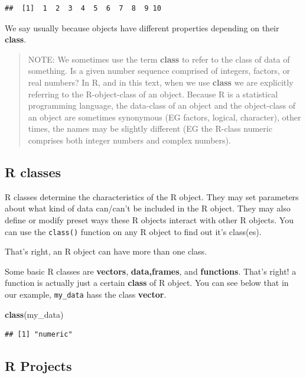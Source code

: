 \documentclass[
]{book}
\newenvironment{Shaded}{\begin{snugshade}}{\end{snugshade}}
\newcommand{\FunctionTok}[1]{\textcolor[rgb]{0.13,0.29,0.53}{\textbf{#1}}}
\newcommand{\NormalTok}[1]{#1}
\begin{document}
\begin{verbatim}
##  [1]  1  2  3  4  5  6  7  8  9 10
\end{verbatim}

We say usually because objects have different properties depending on their \textbf{class}.

\begin{quote}
NOTE: We sometimes use the term \textbf{class} to refer to the class of data of something. Is a given number sequence comprised of integers, factors, or real numbers? In R, and in this text, when we use \textbf{class} we are explicitly referring to the R-object-class of an object. Because R is a statistical programming language, the data-class of an object and the object-class of an object are sometimes synonymous (EG factors, logical, character), other times, the names may be slightly different (EG the R-class numeric comprises both integer numbers and complex numbers).
\end{quote}

\hypertarget{r-classes}{%
\subsection{R classes}\label{r-classes}}

R classes determine the characteristics of the R object. They may set parameters about what kind of data can/can't be included in the R object. They may also define or modify preset ways these R objects interact with other R objects. You can use the \texttt{class()} function on any R object to find out it's class(es).

That's right, an R object can have more than one class.

Some basic R classes are \textbf{vectors}, \textbf{data,frames}, and \textbf{functions}. That's right! a function is actually just a certain \textbf{class} of R object. You can see below that in our example, \texttt{my\_data} hass the class \textbf{vector}.

\begin{Shaded}
\begin{Highlighting}[]
\FunctionTok{class}\NormalTok{(my\_data)}
\end{Highlighting}
\end{Shaded}

\begin{verbatim}
## [1] "numeric"
\end{verbatim}

\hypertarget{r-projects}{%
\subsection{R Projects}\label{r-projects}}
\end{document}
